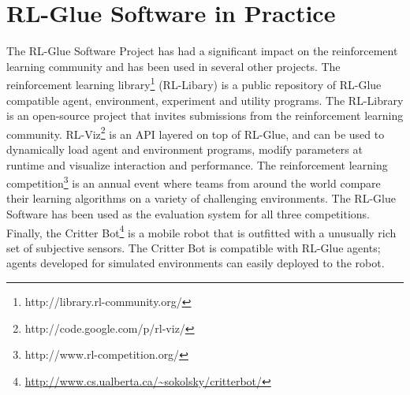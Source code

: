 \documentclass[twopage,11pt]{article}
\begin{document}






\section{RL-Glue Software in Practice}
The RL-Glue Software Project has had a significant impact on the reinforcement learning community and has been used in several other projects. The reinforcement learning library\footnote{http://library.rl-community.org/} (RL-Libary) is a public repository of RL-Glue compatible agent, environment, experiment and utility programs.  The RL-Library is an open-source project that invites submissions from the reinforcement learning community. RL-Viz\footnote{http://code.google.com/p/rl-viz/} is an API layered on top of  RL-Glue, and can be used to dynamically load agent and environment programs, modify parameters at runtime and visualize interaction and performance.  The reinforcement learning competition\footnote{http://www.rl-competition.org/} is an annual event where teams from around the world compare their learning algorithms on a variety of challenging environments. The RL-Glue Software has been used as the evaluation system for all three competitions. Finally, the Critter Bot\footnote{\url{http://www.cs.ualberta.ca/~sokolsky/critterbot/}} is a mobile robot that is outfitted with a unusually rich set of subjective sensors. The Critter Bot is compatible with RL-Glue agents; agents developed for simulated environments can easily deployed to the robot.
\end{document}
